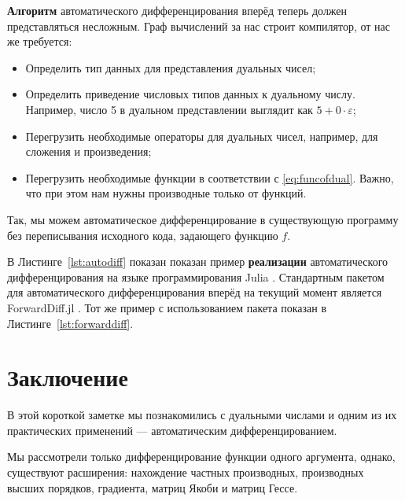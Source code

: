 \documentclass{article}
\newcommand{\dual}{\varepsilon}
\theoremstyle{definition}
\begin{document}
\textbf{Алгоритм} автоматического дифференцирования вперёд теперь должен представляться несложным. Граф вычислений за нас строит компилятор, от нас же требуется:
\begin{itemize}
  \item Определить тип данных для представления дуальных чисел;
  \item Определить приведение числовых типов данных к дуальному числу. Например, число 5 в дуальном представлении выглядит как $5 + 0\cdot\dual$;
  \item Перегрузить необходимые операторы для дуальных чисел, например, для сложения и произведения;
  \item Перегрузить необходимые функции в соответствии с \eqref{eq:funcofdual}. Важно, что при этом нам нужны производные только от  функций.
\end{itemize}

Так, мы можем  автоматическое дифференцирование в существующую программу без переписывания исходного кода, задающего функцию $f$.

В Листинге~\ref{lst:autodiff} показан показан пример \textbf{реализации} автоматического дифференцирования на языке программирования Julia \cite{bezanson_julia_2017}. Стандартным пакетом для автоматического дифференцирования вперёд на текущий момент является ForwardDiff.jl \cite{revels_forward-mode_2016}. Тот же пример с использованием пакета показан в Листинге~\ref{lst:forwarddiff}.





\section{Заключение}
В этой короткой заметке мы познакомились с дуальными числами и одним из их практических применений --- автоматическим дифференцированием.

Мы рассмотрели только дифференцирование функции одного аргумента, однако, существуют расширения: нахождение частных производных, производных высших порядков, градиента, матриц Якоби и матриц Гессе.
\end{document}
